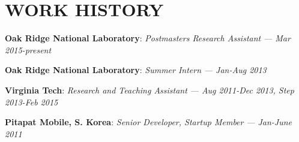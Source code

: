 \section{WORK HISTORY} 
\vspace{0.03in} 
{\bf Oak Ridge National Laboratory}: \emph{Postmasters Research Assistant}
{\it \footnotesize --- Mar 2015-present}
\vspace{-0.15in}

{\bf Oak Ridge National Laboratory}: \emph{Summer Intern}
{\it \footnotesize --- Jan-Aug 2013}
\vspace{-0.15in}

{\bf Virginia Tech}: \emph{Research and Teaching Assistant}
{\it \footnotesize --- Aug 2011-Dec 2013, Step 2013-Feb 2015}
\vspace{-0.15in}

{\bf Pitapat Mobile, S. Korea}: \emph{Senior Developer, Startup Member}
{\it \footnotesize --- Jan-June 2011}
\vspace{-0.15in}

